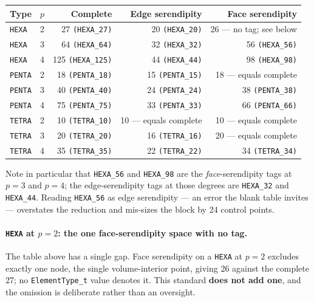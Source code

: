 \documentclass[11pt,letterpaper]{article}
\newif\ifvfourdraft
\newenvironment{v4block}{\ifvfourdraft\color{v4violet}\fi\ignorespaces}{\par}
\newcommand{\vfourmark}{\ifvfourdraft\textcolor{v4violet}{\textbf{[v4]}}\ \fi}
\begin{document}
\begin{v4block}
\smallskip
\noindent\footnotesize
\begin{tabular}{@{}llrrr@{}}
\toprule
\textbf{Type} & $p$ & \textbf{Complete} & \textbf{Edge serendipity} & \textbf{Face serendipity} \\
\midrule
\texttt{HEXA}  & 2 & 27 \texttt{(HEXA\_27)}   & 20 \texttt{(HEXA\_20)}  & 26 --- no tag; see below \\
\texttt{HEXA}  & 3 & 64 \texttt{(HEXA\_64)}   & 32 \texttt{(HEXA\_32)}  & 56 \texttt{(HEXA\_56)} \\
\texttt{HEXA}  & 4 & 125 \texttt{(HEXA\_125)} & 44 \texttt{(HEXA\_44)}  & 98 \texttt{(HEXA\_98)} \\
\texttt{PENTA} & 2 & 18 \texttt{(PENTA\_18)}  & 15 \texttt{(PENTA\_15)} & 18 --- equals complete \\
\texttt{PENTA} & 3 & 40 \texttt{(PENTA\_40)}  & 24 \texttt{(PENTA\_24)} & 38 \texttt{(PENTA\_38)} \\
\texttt{PENTA} & 4 & 75 \texttt{(PENTA\_75)}  & 33 \texttt{(PENTA\_33)} & 66 \texttt{(PENTA\_66)} \\
\texttt{TETRA} & 2 & 10 \texttt{(TETRA\_10)}  & 10 --- equals complete   & 10 --- equals complete \\
\texttt{TETRA} & 3 & 20 \texttt{(TETRA\_20)}  & 16 \texttt{(TETRA\_16)} & 20 --- equals complete \\
\texttt{TETRA} & 4 & 35 \texttt{(TETRA\_35)}  & 22 \texttt{(TETRA\_22)} & 34 \texttt{(TETRA\_34)} \\
\bottomrule
\end{tabular}
\normalsize

\smallskip
\noindent Note in particular that \texttt{HEXA\_56} and \texttt{HEXA\_98} are the
\emph{face}-serendipity tags at $p=3$ and $p=4$; the edge-serendipity tags at
those degrees are \texttt{HEXA\_32} and \texttt{HEXA\_44}.  Reading
\texttt{HEXA\_56} as edge serendipity --- an error the blank table invites ---
overstates the reduction and mis-sizes the block by 24 control points.

\paragraph{\vfourmark \texttt{HEXA} at $p=2$: the one face-serendipity space with no tag.}
The table above has a single gap.  Face serendipity on a \texttt{HEXA} at $p=2$
excludes exactly one node, the single volume-interior point, giving 26 against the
complete 27; no \texttt{ElementType\_t} value denotes it.  This standard
\textbf{does not add one}, and the omission is deliberate rather than an oversight.


\end{v4block}
\end{document}
